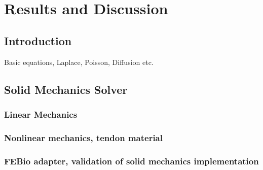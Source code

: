 \chapter{Results and Discussion}\label{sec:results}



\section{Introduction}
Basic equations, Laplace, Poisson, Diffusion etc.

\section{Solid Mechanics Solver}

\subsection{Linear Mechanics}
\subsection{Nonlinear mechanics, tendon material}
\subsection{FEBio adapter, validation of solid mechanics implementation}




